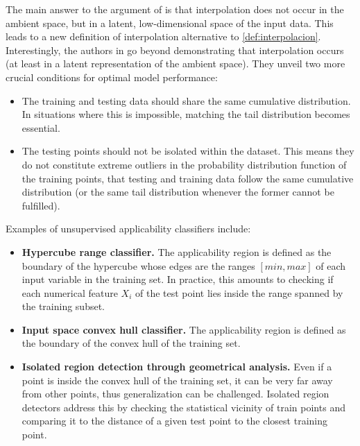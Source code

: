 \indent The main answer to the argument of \cite{balestriero2021learning} is that interpolation does not occur in the ambient space, but in a latent, low-dimensional space of the input data\cite{bonnasse2022interpolation}. This leads to a new definition of interpolation alternative to \cref{def:interpolacion}.\\
%
\indent Interestingly, the authors in \cite{bonnasse2022interpolation} go beyond demonstrating that interpolation occurs (at least in a latent representation of the ambient space). They unveil two more crucial conditions for optimal model performance:
%
\begin{itemize}
	\item The training and testing data should share the same cumulative distribution. In situations where this is impossible, matching the tail distribution becomes essential.
	\item The testing points should not be isolated within the dataset. This means they do not constitute extreme outliers in the probability distribution function of the training points, that testing and training data follow the same cumulative distribution (or the same tail distribution whenever the former cannot be fulfilled).\\
\end{itemize}
%
Examples of unsupervised applicability classifiers include:
\begin{itemize}
	\item \textbf{Hypercube range classifier.} The applicability region is defined as the boundary of the hypercube whose edges are the ranges $[min, max]$ of each input variable in the training set. In practice, this amounts to checking if each numerical feature $X_i$ of the test point lies inside the range spanned by the training subset.
	\item \textbf{Input space convex hull classifier.} The applicability region is defined as the boundary of the convex hull of the training set.
	\item \textbf{Isolated region detection through geometrical analysis.} Even if a point is inside the convex hull of the training set, it can be very far away from other points, thus generalization can be challenged. Isolated region detectors address this by checking the statistical vicinity of train points and comparing it to the distance of a given test point to the closest training point.\\
\end{itemize}

